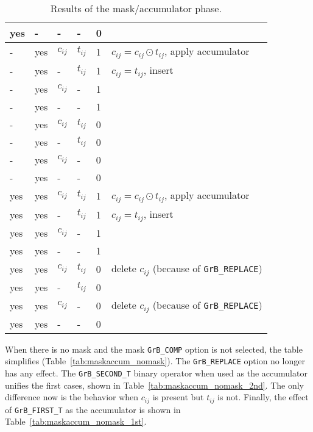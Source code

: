 \documentclass[12pt]{article}
\begin{document}
\begin{table}
{\begin{tabular}{lllll|l}
    yes&-   &  -       &  -        & 0    &   \\
\hline
    -  &yes & $c_{ij}$ & $t_{ij}$  & 1    &  $c_{ij} = c_{ij} \odot t_{ij}$, apply accumulator \\
    -  &yes &  -       & $t_{ij}$  & 1    &  $c_{ij} = t_{ij}$, insert \\
    -  &yes & $c_{ij}$ &  -        & 1    &   \\
    -  &yes &  -       &  -        & 1    &   \\
    -  &yes & $c_{ij}$ & $t_{ij}$  & 0    &   \\
    -  &yes &  -       & $t_{ij}$  & 0    &   \\
    -  &yes & $c_{ij}$ &  -        & 0    &   \\
    -  &yes &  -       &  -        & 0    &   \\
\hline
    yes&yes & $c_{ij}$ & $t_{ij}$  & 1    &  $c_{ij} = c_{ij} \odot t_{ij}$, apply accumulator \\
    yes&yes &  -       & $t_{ij}$  & 1    &  $c_{ij} = t_{ij}$, insert \\
    yes&yes & $c_{ij}$ &  -        & 1    &   \\
    yes&yes &  -       &  -        & 1    &   \\
    yes&yes & $c_{ij}$ & $t_{ij}$  & 0    &  delete $c_{ij}$  (because of \verb'GrB_REPLACE') \\
    yes&yes &  -       & $t_{ij}$  & 0    &   \\
    yes&yes & $c_{ij}$ &  -        & 0    &  delete $c_{ij}$  (because of \verb'GrB_REPLACE') \\
    yes&yes &  -       &  -        & 0    &   \\
\hline
\end{tabular}
}
\caption{Results of the mask/accumulator phase. \label{tab:maskaccum}}
\end{table}

When there is no mask and the mask \verb'GrB_COMP' option is not selected, the
table simplifies (Table~\ref{tab:maskaccum_nomask}).  The \verb'GrB_REPLACE'
option no longer has any effect.  The \verb'GrB_SECOND_T' binary operator when
used as the accumulator unifies the first cases, shown in
Table~\ref{tab:maskaccum_nomask_2nd}.  The only difference now is the behavior
when $c_{ij}$ is present but $t_{ij}$ is not.  Finally, the effect of
\verb'GrB_FIRST_T' as the accumulator is shown in
Table~\ref{tab:maskaccum_nomask_1st}. 
\end{document}
